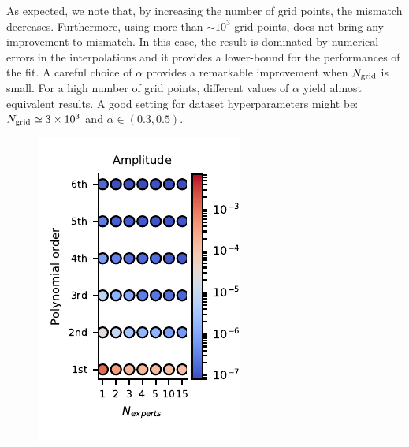 \documentclass[twocolumn,showpacs,preprintnumbers,nofootinbib,prd,
superscriptaddress,10pt]{revtex4-1}
\begin{document}
As expected, we note that, by increasing the number of grid points, the mismatch decreases. Furthermore, using more than $\sim 10^3$ grid points, does not bring any improvement to mismatch. In this case, the result is dominated by numerical errors in the interpolations and it provides a lower-bound for the performances of the fit.
A careful choice of $\alpha$ provides a remarkable improvement when $N_{\rm grid}$ is small. For a high number of grid points, different values of $\alpha$ yield almost equivalent results.
A good setting for dataset hyperparameters might be: $N_{\rm grid} \simeq 3 \times 10^{3}$ and $\alpha \in (0.3,0.5)$.
\begin{figure}[!t]
	\centering
    \begin{minipage}{.5\linewidth}
        \centering
        \includegraphics[width=\linewidth]{img/MoE_mismatch_amp.pdf}

\end{minipage}
\end{figure}
\end{document}
